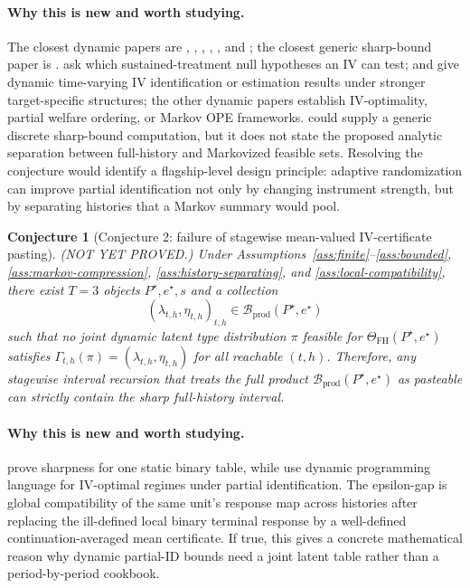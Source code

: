 \documentclass[11pt]{article}
\theoremstyle{definition}
\theoremstyle{plain}
\newtheorem{conjecture}{Conjecture}
\theoremstyle{remark}
\begin{document}
\paragraph{Why this is new and worth studying.}
The closest dynamic papers are \citet{SwansonLabrecqueHernan2018}, \citet{MichaelCuiLorchTchetgen2024}, \citet{VanDenBergBonevMammen2020}, \citet{ChenZhang2023}, \citet{Han2024}, and \citet{XuZhuShiLuoSong2023}; the closest generic sharp-bound paper is \citet{DuarteFinkelsteinKnoxMummoloShpitser2024}.  \citet{SwansonLabrecqueHernan2018} ask which sustained-treatment null hypotheses an IV can test; \citet{MichaelCuiLorchTchetgen2024} and \citet{VanDenBergBonevMammen2020} give dynamic time-varying IV identification or estimation results under stronger target-specific structures; the other dynamic papers establish IV-optimality, partial welfare ordering, or Markov OPE frameworks.  \citet{DuarteFinkelsteinKnoxMummoloShpitser2024} could supply a generic discrete sharp-bound computation, but it does not state the proposed analytic separation between full-history and Markovized feasible sets.  Resolving the conjecture would identify a flagship-level design principle: adaptive randomization can improve partial identification not only by changing instrument strength, but by separating histories that a Markov summary would pool.

\begin{conjecture}[Conjecture 2: failure of stagewise mean-valued IV-certificate pasting]\label{conj:no-stagewise-pasting}
(NOT YET PROVED.)  Under Assumptions~\ref{ass:finite}--\ref{ass:bounded}, \ref{ass:markov-compression}, \ref{ass:history-separating}, and \ref{ass:local-compatibility}, there exist \(T=3\) objects \(P^\star,e^\star,s\) and a collection
\[
(\lambda_{t,h},\eta_{t,h})_{t,h}\in\mathcal{B}_{\mathrm{prod}}(P^\star,e^\star)
\]
such that no joint dynamic latent type distribution \(\pi\) feasible for \(\Theta_{\mathrm{FH}}(P^\star,e^\star)\) satisfies \(\Gamma_{t,h}(\pi)=(\lambda_{t,h},\eta_{t,h})\) for all reachable \((t,h)\).  Therefore, any stagewise interval recursion that treats the full product \(\mathcal{B}_{\mathrm{prod}}(P^\star,e^\star)\) as pasteable can strictly contain the sharp full-history interval.
\end{conjecture}
\paragraph{Why this is new and worth studying.}
\citet{BalkePearl1997} prove sharpness for one static binary table, while \citet{ChenZhang2023} use dynamic programming language for IV-optimal regimes under partial identification.  The epsilon-gap is global compatibility of the same unit's response map across histories after replacing the ill-defined local binary terminal response by a well-defined continuation-averaged mean certificate.  If true, this gives a concrete mathematical reason why dynamic partial-ID bounds need a joint latent table rather than a period-by-period cookbook.
\end{document}
